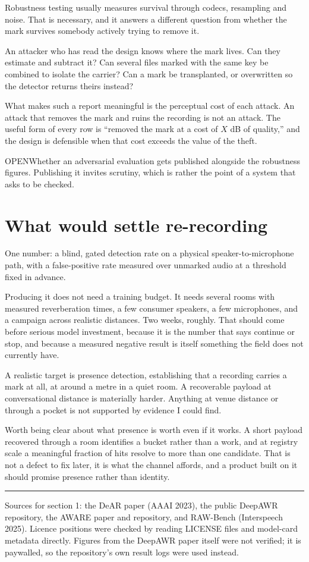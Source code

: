 \documentclass[11pt]{article}
\newcommand{\decision}[1]{%
  \par\vspace{4pt}%
  \noindent\textcolor{quiet}{\sansfont\footnotesize OPEN}\quad #1\par\vspace{2pt}}
\begin{document}
Robustness testing usually measures survival through codecs, resampling and
noise. That is necessary, and it answers a different question from whether the
mark survives somebody actively trying to remove it.

An attacker who has read the design knows where the mark lives. Can they estimate
and subtract it? Can several files marked with the same key be combined to
isolate the carrier? Can a mark be transplanted, or overwritten so the detector
returns theirs instead?

What makes such a report meaningful is the perceptual cost of each attack. An
attack that removes the mark and ruins the recording is not an attack. The useful
form of every row is ``removed the mark at a cost of $X$ dB of quality,'' and the
design is defensible when that cost exceeds the value of the theft.

\decision{Whether an adversarial evaluation gets published alongside the
robustness figures. Publishing it invites scrutiny, which is rather the point of
a system that asks to be checked.}

\section{What would settle re-recording}

One number: a blind, gated detection rate on a physical speaker-to-microphone
path, with a false-positive rate measured over unmarked audio at a threshold
fixed in advance.

Producing it does not need a training budget. It needs several rooms with
measured reverberation times, a few consumer speakers, a few microphones, and a
campaign across realistic distances. Two weeks, roughly. That should come before
serious model investment, because it is the number that says continue or stop,
and because a measured negative result is itself something the field does not
currently have.

A realistic target is presence detection, establishing that a recording carries a
mark at all, at around a metre in a quiet room. A recoverable payload at
conversational distance is materially harder. Anything at venue distance or
through a pocket is not supported by evidence I could find.

Worth being clear about what presence is worth even if it works. A short payload
recovered through a room identifies a bucket rather than a work, and at registry
scale a meaningful fraction of hits resolve to more than one candidate. That is
not a defect to fix later, it is what the channel affords, and a product built on
it should promise presence rather than identity.

\vspace{10pt}
\textcolor{rule}{\hrule}
\vspace{8pt}

{\sansfont\footnotesize\textcolor{quiet}{Sources for section 1: the DeAR paper
(AAAI 2023), the public DeepAWR repository, the AWARE paper and repository, and
RAW-Bench (Interspeech 2025). Licence positions were checked by reading LICENSE
files and model-card metadata directly. Figures from the DeepAWR paper itself
were not verified; it is paywalled, so the repository's own result logs were used
instead.}}
\end{document}
